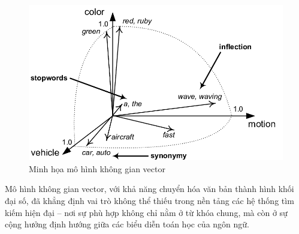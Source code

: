 \begin{figure}[H]
    \caption{Minh họa mô hình không gian vector}
    \begin{center}
        \includegraphics[width=\linewidth]{assets/vsm-illustration.png}
    \end{center}
\end{figure}

Mô hình không gian vector, với khả năng chuyển hóa văn bản thành hình khối đại số, đã khẳng định vai trò không thể thiếu trong nền tảng các hệ thống tìm kiếm hiện đại -- nơi sự phù hợp không chỉ nằm ở từ khóa chung, mà còn ở sự cộng hưởng định hướng giữa các biểu diễn toán học của ngôn ngữ.
